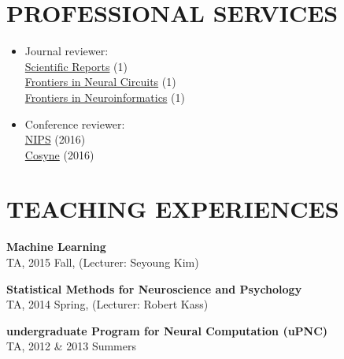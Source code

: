 \documentclass[paper=letter,fontsize=11pt]{scrartcl} %
\newcommand{\NewPart}[2]{\section*{\uppercase{#1} #2}}
\begin{document}



\NewPart{Professional Services}{}
\begin{itemize}
\item Journal reviewer: \\
\href{https://www.nature.com/srep/}{Scientific Reports} (1)\\
\href{https://www.frontiersin.org/journals/neural-circuits}{Frontiers in Neural Circuits} (1)\\
\href{https://www.frontiersin.org/journals/neuroinformatics}{Frontiers in Neuroinformatics} (1)

\item Conference reviewer: \\
\href{https://nips.cc/Conferences/2016/}{NIPS} (2016)\\
\href{http://www.cosyne.org/c/index.php?title=Cosyne_16}{Cosyne} (2016)
\end{itemize}






\NewPart{Teaching Experiences}{}
\begin{etaremune}
\item \textbf{Machine Learning}  \\
TA, 2015 Fall, (Lecturer: Seyoung Kim)

\item \textbf{Statistical Methods for Neuroscience and Psychology}\\
TA, 2014 Spring, (Lecturer: Robert Kass)

\item \textbf{undergraduate Program for Neural Computation (uPNC)}\\
TA, 2012 \& 2013 Summers
\end{etaremune}
\end{document}
